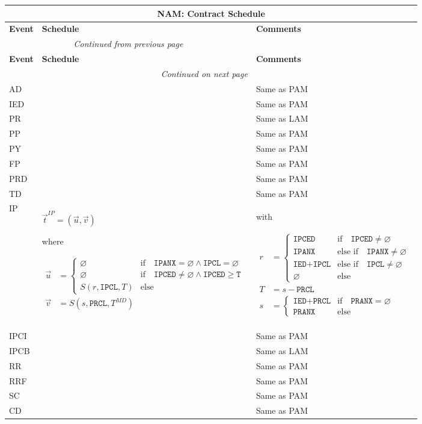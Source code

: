 \documentclass[9pt,oneside]{amsart}
\newenvironment{schedule}[1]{
	\hfill %
	\begin{longtable}{| p{0.05\textwidth} | p{0.5\textwidth} |  p{0.4\textwidth} |}
	\multicolumn{3}{c}{\textbf{#1: Contract Schedule}}\\
	\hline
	\textbf{Event} & \textbf{Schedule} & \textbf{Comments} \\
	\hline
	\endfirsthead
	\multicolumn{2}{c}{\textit{Continued from previous page}} \\
	\hline
	\textbf{Event} & \textbf{Schedule} & \textbf{Comments} \\
	\hline
	\endhead
	\hline \multicolumn{2}{r}{\textit{Continued on next page}} \\
	\endfoot
	\endlastfoot
}{%
	\hline
	\end{longtable}
}
\newcommand{\attr}[1]{\texttt{#1}}
\newcommand{\sdl}[3]{S(#1,#2,#3)}
\newcommand{\undef}{\varnothing}
\begin{document}
\begin{schedule}{NAM}
	AD & & Same as PAM \\
	\hline
	IED & & Same as PAM \\
	\hline
	PR & & Same as LAM \\
	\hline
	PP & & Same as PAM \\
	\hline
	PY & & Same as PAM \\
	\hline
	FP & & Same as PAM \\
	\hline
	PRD & & Same as PAM \\
	\hline
	TD & & Same as PAM \\
	\hline
	IP & $\vec{t}^{IP} = (\vec{u},\vec{v})$ \par
		where \par
		{$\begin{aligned} \vec{u} &= \begin{cases} \undef & \text{if}\quad \attr{IPANX}=\undef\land\attr{IPCL}=\undef \\
							\undef & \text{if}\quad \attr{IPCED}\neq\undef\land\attr{IPCED}\geq\attr{T}\\
							\sdl{r}{\attr{IPCL}}{T} & \text{else} \end{cases} \\
				\vec{v} &= \sdl{s}{\attr{PRCL}}{T^{MD}} \end{aligned}$}
		 & with\par {$\begin{aligned} r &= \begin{cases} \attr{IPCED} & \text{if}\quad \attr{IPCED}\neq\undef \\
								\attr{IPANX} & \text{else if}\quad \attr{IPANX}\neq\undef \\
								\attr{IED}+\attr{IPCL} & \text{else if}\quad \attr{IPCL}\neq\undef \\
								\undef & \text{else} \end{cases} \\
						T &= s-\attr{PRCL} \\
						s &= \begin{cases} \attr{IED}+\attr{PRCL} & \text{if} \quad \attr{PRANX} = \undef \\
					   \attr{PRANX} & \text{else} \end{cases} \end{aligned}$} \\
	\hline
	IPCI & & Same as PAM \\
  	\hline
	IPCB & & Same as LAM \\
	\hline
	RR & & Same as PAM \\
	\hline
	RRF & & Same as PAM \\
  	\hline
	SC & & Same as PAM \\
	\hline
	CD & & Same as PAM \\
\end{schedule}
\end{document}
